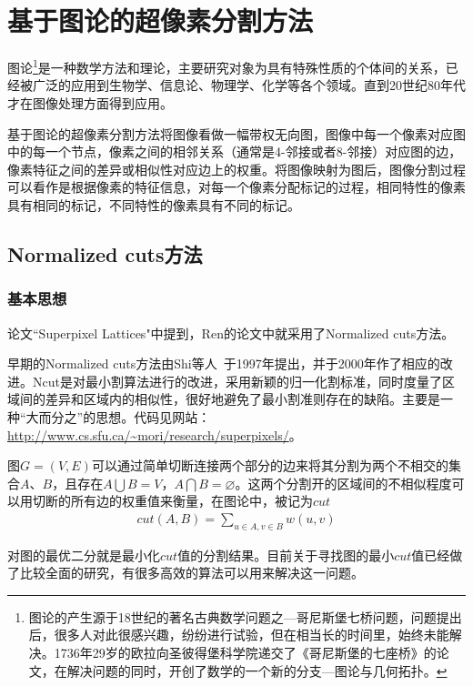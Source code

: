 \documentclass[12pt]{article}
\begin{document}
\section{基于图论的超像素分割方法}

图论\footnote{图论的产生源于18世纪的著名古典数学问题之---哥尼斯堡七桥问题，问题提出后，很多人对此很感兴趣，纷纷进行试验，但在相当长的时间里，始终未能解决。1736年29岁的欧拉向圣彼得堡科学院递交了《哥尼斯堡的七座桥》的论文，在解决问题的同时，开创了数学的一个新的分支---图论与几何拓扑。}是一种数学方法和理论，主要研究对象为具有特殊性质的个体间的关系，已经被广泛的应用到生物学、信息论、物理学、化学等各个领域。直到20世纪80年代才在图像处理方面得到应用。

基于图论的超像素分割方法将图像看做一幅带权无向图，图像中每一个像素对应图中的每一个节点，像素之间的相邻关系（通常是4-邻接或者8-邻接）对应图的边，像素特征之间的差异或相似性对应边上的权重。将图像映射为图后，图像分割过程可以看作是根据像素的特征信息，对每一个像素分配标记的过程，相同特性的像素具有相同的标记，不同特性的像素具有不同的标记。

\subsection{Normalized cuts方法}

\subsubsection{基本思想}

论文“Superpixel Lattices"中提到，Ren的论文\cite{ren2003learning}中就采用了Normalized cuts方法。

早期的Normalized cuts方法由Shi等人~\cite{shi1997normalized}于1997年提出，并于2000年作了相应的改进\cite{shi2000normalized}。Ncut是对最小割算法进行的改进，采用新颖的归一化割标准，同时度量了区域间的差异和区域内的相似性，很好地避免了最小割准则存在的缺陷。主要是一种“大而分之”的思想。代码见网站：\url{http://www.cs.sfu.ca/~mori/research/superpixels/}。

图$G = (V, E)$可以通过简单切断连接两个部分的边来将其分割为两个不相交的集合$A$、$B$，且存在$A \bigcup B = V$，$A \bigcap B = \varnothing$。这两个分割开的区域间的不相似程度可以用切断的所有边的权重值来衡量，在图论中，被记为$cut$
\begin{align}
cut(A, B) = \sum_{u \in A, v \in B}w(u, v)
\end{align}

对图的最优二分就是最小化$cut$值的分割结果。目前关于寻找图的最小$cut$值已经做了比较全面的研究，有很多高效的算法可以用来解决这一问题。
\end{document}
